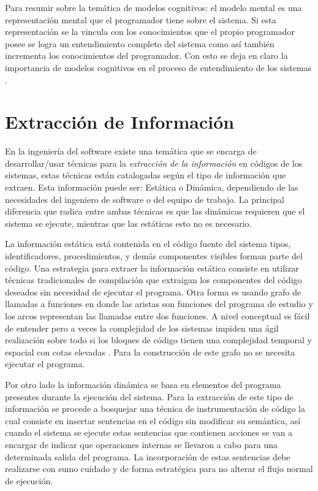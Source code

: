 \documentclass[a4paper,12pt]{report}
\begin{document}
Para resumir sobre la temática de modelos cognitivos: el modelo mental es una representación mental que el programador tiene sobre el sistema. Si esta representación se la vincula con los conocimientos que el propio programador posee se logra un entendimiento completo del sistema como así también incrementa los conocimientos del programador. Con esto se deja en claro la importancia de modelos cognitivos en el proceso de entendimiento de los sistemas \cite{MBPHRU10}.

\section{Extracción de Información}

En la ingeniería del software existe una temática que se encarga de desarrollar/usar técnicas para la \textit{extracción de la información} en códigos de los sistemas, estas técnicas están catalogadas según el tipo de información que extraen.
Esta información puede ser: Estática o Dinámica, dependiendo de las necesidades del ingeniero de software o del equipo de trabajo. La principal diferencia que radica entre ambas técnicas es que las dinámicas requieren que el sistema se ejecute, mientras que las estáticas esto no es necesario.

La información estática está contenida en el código fuente del sistema 
tipos, identificadores, procedimientos, y demás componentes visibles forman parte del código. Una estrategia para extraer la información estática consiste en utilizar técnicas tradicionales de compilación que extraigan los componentes del código deseados sin necesidad de ejecutar el programa.
Otra forma es usando grafo de llamadas a funciones en donde las aristas son funciones del programa de estudio y los arcos representan las llamadas entre dos funciones. A nivel conceptual es fácil de entender pero a veces la complejidad de los sistemas impiden una ágil realización sobre todo si los bloques de código tienen una complejidad temporal y espacial con cotas elevadas \cite{MBPHRU10}. Para la construcción de este grafo no se necesita ejecutar el programa.

Por otro lado la información dinámica se basa en elementos del programa presentes durante la ejecución del sistema. Para la extracción de este tipo de información se procede a bosquejar una técnica de instrumentación de código la cual consiste en insertar sentencias en el código sin modificar su semántica, así cuando el sistema se ejecute estas sentencias que contienen acciones se van a encargar de indicar que operaciones internas se llevaron a cabo para una determinada salida del programa.
La incorporación de estas sentencias debe realizarse con sumo cuidado y de forma estratégica para no alterar el flujo normal de ejecución.
\end{document}
